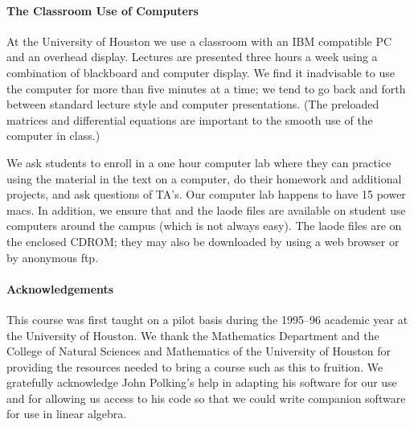 \documentclass{ximera}
\begin{document}


\paragraph{The Classroom Use of Computers}  At the University of Houston we
use a classroom with an IBM compatible PC and an overhead display.  Lectures 
are presented three hours a week using a combination of blackboard and 
computer display.  We find it inadvisable to use the computer for more than 
five minutes at a time; we tend to go back and forth between standard lecture 
style and computer presentations.  (The preloaded matrices and differential 
equations are important to the smooth use of the computer in class.)  

We ask students to enroll in a one hour computer lab where they can practice 
using the material in the text on a computer, do their homework and additional
projects, and ask questions of TA's.  Our computer lab happens to have 15 
power macs.  In addition, we ensure that \Matlab and the {\sf laode} files are
available on student use computers around the campus (which is not always 
easy).  The {\sf laode} files are on the enclosed CDROM; they may also be 
downloaded by using a web browser or by anonymous ftp.

\newpage

\paragraph{Acknowledgements} This course was first taught on a pilot
basis during the 1995--96 academic year at the University of Houston.
We thank the Mathematics Department and the College of Natural
Sciences and Mathematics of the University of Houston for providing
the resources needed to bring a course such as this to fruition.  We
gratefully acknowledge John Polking's help in adapting his software
for our use and for allowing us access to his code so that we could
write companion software for use in linear algebra.
\end{document}
